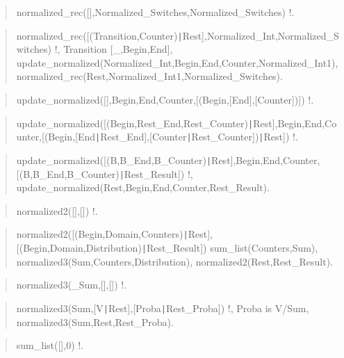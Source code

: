 \begin{quote}
normalized_rec([],Normalized_Switches,Normalized_Switches) \Sneck{}
!.
\end{quote}

\begin{quote}
normalized_rec([(Transition,Counter){\tt\string|}Rest],Normalized_Int,Normalized_Switches) \Sneck{}
!,
Transition \Suniv{} [_,Begin,End],
update_normalized(Normalized_Int,Begin,End,Counter,Normalized_Int1),
normalized_rec(Rest,Normalized_Int1,Normalized_Switches).
\end{quote}

\begin{quote}
update_normalized([],Begin,End,Counter,[(Begin,[End],[Counter])]) \Sneck{}
!.
\end{quote}

\begin{quote}
update_normalized([(Begin,Rest_End,Rest_Counter){\tt\string|}Rest],Begin,End,Counter,[(Begin,[End{\tt\string|}Rest_End],[Counter{\tt\string|}Rest_Counter]){\tt\string|}Rest]) \Sneck{}
!.
\end{quote}

\begin{quote}
update_normalized([(B,B_End,B_Counter){\tt\string|}Rest],Begin,End,Counter,[(B,B_End,B_Counter){\tt\string|}Rest_Result]) \Sneck{}
!,
update_normalized(Rest,Begin,End,Counter,Rest_Result).
\end{quote}

\begin{quote}
normalized2([],[]) \Sneck{}
!.
\end{quote}

\begin{quote}
normalized2([(Begin,Domain,Counters){\tt\string|}Rest],[(Begin,Domain,Distribution){\tt\string|}Rest_Result]) \Sneck{}
sum_list(Counters,Sum),
normalized3(Sum,Counters,Distribution),
normalized2(Rest,Rest_Result).
\end{quote}

\begin{quote}
normalized3(_Sum,[],[]) \Sneck{}
!.
\end{quote}

\begin{quote}
normalized3(Sum,[V{\tt\string|}Rest],[Proba{\tt\string|}Rest_Proba]) \Sneck{}
!,
Proba is V/Sum,
normalized3(Sum,Rest,Rest_Proba).
\end{quote}

\begin{quote}
sum_list([],0) \Sneck{}
!.
\end{quote}

